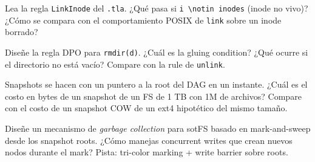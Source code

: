 \begin{ejercicio}[$\star\star$]
Lea la regla \texttt{LinkInode} del \texttt{.tla}. ¿Qué pasa si
\texttt{i \textbackslash notin inodes} (inode no vivo)? ¿Cómo
se compara con el comportamiento POSIX de \texttt{link} sobre
un inode borrado?
\end{ejercicio}

\begin{ejercicio}[$\star\star$]
Diseñe la regla DPO para \texttt{rmdir(d)}. ¿Cuál es la gluing
condition? ¿Qué ocurre si el directorio no está vacío? Compare
con la rule de \texttt{unlink}.
\end{ejercicio}

\begin{ejercicio}[$\star\star\star$]
Snapshots se hacen con un puntero a la root del DAG en un
instante. ¿Cuál es el costo en bytes de un snapshot de un FS de
1 TB con 1M de archivos? Compare con el costo de un snapshot
COW de un ext4 hipotético del mismo tamaño.
\end{ejercicio}

\begin{ejercicio}[$\star\star\star$]
Diseñe un mecanismo de \emph{garbage collection} para sotFS
basado en mark-and-sweep desde los snapshot roots. ¿Cómo
manejas concurrent writes que crean nuevos nodos durante el
mark? Pista: tri-color marking + write barrier sobre roots.
\end{ejercicio}

